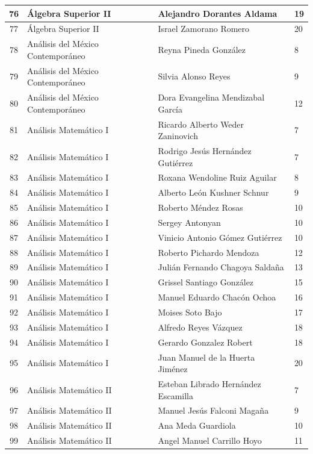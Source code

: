 {\begin{longtable}{|c|p{6.5cm}|p{5cm}|p{1.5cm}|}
76 & Álgebra Superior II & Alejandro Dorantes Aldama & 19 \\ \hline
77 & Álgebra Superior II & Israel Zamorano Romero & 20 \\ \hline
78 & Análisis del México Contemporáneo & Reyna Pineda González & 8 \\ \hline
79 & Análisis del México Contemporáneo & Silvia Alonso Reyes & 9 \\ \hline
80 & Análisis del México Contemporáneo & Dora Evangelina Mendizabal García & 12 \\ \hline
81 & Análisis Matemático I & Ricardo Alberto Weder Zaninovich & 7 \\ \hline
82 & Análisis Matemático I & Rodrigo Jesús Hernández Gutiérrez & 7 \\ \hline
83 & Análisis Matemático I & Roxana Wendoline Ruiz Aguilar & 8 \\ \hline
84 & Análisis Matemático I & Alberto León Kushner Schnur & 9 \\ \hline
85 & Análisis Matemático I & Roberto Méndez Rosas & 10 \\ \hline
86 & Análisis Matemático I & Sergey Antonyan & 10 \\ \hline
87 & Análisis Matemático I & Vinicio Antonio Gómez Gutiérrez & 10 \\ \hline
88 & Análisis Matemático I & Roberto Pichardo Mendoza & 12 \\ \hline
89 & Análisis Matemático I & Julián Fernando Chagoya Saldaña & 13 \\ \hline
90 & Análisis Matemático I & Grissel Santiago González & 15 \\ \hline
91 & Análisis Matemático I & Manuel Eduardo Chacón Ochoa & 16 \\ \hline
92 & Análisis Matemático I & Moises Soto Bajo & 17 \\ \hline
93 & Análisis Matemático I & Alfredo Reyes Vázquez & 18 \\ \hline
94 & Análisis Matemático I & Gerardo Gonzalez Robert & 18 \\ \hline
95 & Análisis Matemático I & Juan Manuel de la Huerta Jiménez & 20 \\ \hline
96 & Análisis Matemático II & Esteban Librado Hernández Escamilla & 7 \\ \hline
97 & Análisis Matemático II & Manuel Jesús Falconi Magaña & 9 \\ \hline
98 & Análisis Matemático II & Ana Meda Guardiola & 10 \\ \hline
99 & Análisis Matemático II & Angel Manuel Carrillo Hoyo & 11 \\ \hline

\end{longtable}}
